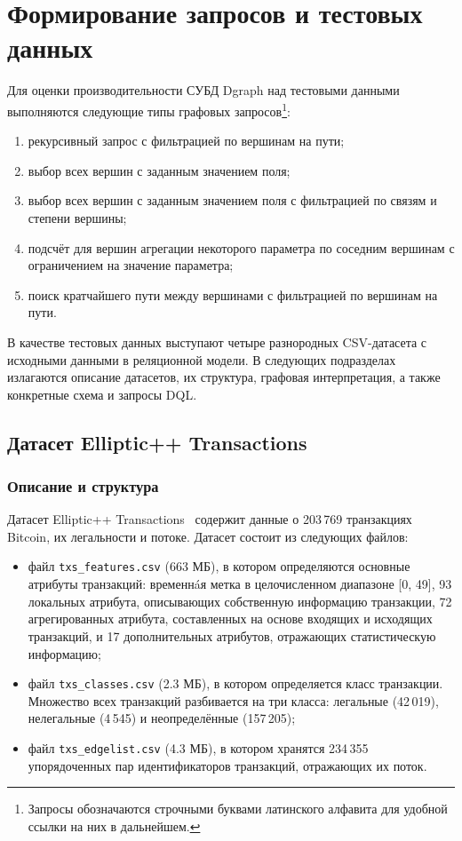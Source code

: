 
\section{Формирование запросов и тестовых данных}

Для оценки производительности СУБД Dgraph над тестовыми данными выполняются следующие типы графовых
запросов\footnote{Запросы обозначаются строчными буквами латинского алфавита для удобной ссылки на них в дальнейшем.}:
\begin{enumerate}[label=(\alph*)]
    \item рекурсивный запрос с фильтрацией по вершинам на пути; \label{query1}
    \item выбор всех вершин с заданным значением поля; \label{query2}
    \item выбор всех вершин с заданным значением поля с фильтрацией по связям и степени вершины; \label{query3}
    \item подсчёт для вершин агрегации некоторого параметра по соседним вершинам с ограничением на значение параметра;
\label{query4}
    \item поиск кратчайшего пути между вершинами с фильтрацией по вершинам на пути. \label{query5}
\end{enumerate}
В качестве тестовых данных выступают четыре разнородных CSV-датасета с исходными данными в реляционной модели. В следующих подразделах
излагаются описание датасетов, их структура, графовая интерпретация, а также конкретные схема и запросы DQL.

\subsection{Датасет Elliptic++ Transactions}

\subsubsection{Описание и структура}

Датасет Elliptic++ Transactions~\cite{elliptic} содержит данные о 203\,769 транзакциях Bitcoin, их легальности и
потоке. Датасет состоит из следующих файлов:
\begin{itemize}
  \item файл \texttt{txs\_features.csv} (663 МБ), в котором определяются основные атрибуты транзакций: временн\'{a}я
метка в целочисленном диапазоне [0, 49], 93 локальных атрибута, описывающих собственную информацию транзакции,
72 агрегированных атрибута, составленных на основе входящих и исходящих транзакций, и 17 дополнительных атрибутов,
отражающих статистическую информацию;
    \item файл \texttt{txs\_classes.csv} (2.3 МБ), в котором определяется класс транзакции. Множество всех транзакций
разбивается на три класса: легальные (42\,019), нелегальные (4\,545) и неопределённые (157\,205);
    \item файл \texttt{txs\_edgelist.csv} (4.3 МБ), в котором хранятся 234\,355 упорядоченных пар идентификаторов
транзакций, отражающих их поток.
\end{itemize}

